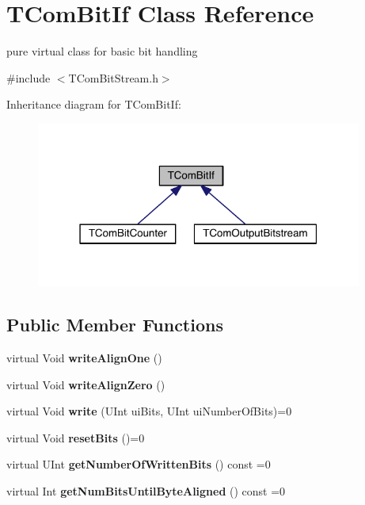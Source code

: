 \hypertarget{class_t_com_bit_if}{}\section{T\+Com\+Bit\+If Class Reference}
\label{class_t_com_bit_if}


pure virtual class for basic bit handling  




{\ttfamily \#include $<$T\+Com\+Bit\+Stream.\+h$>$}



Inheritance diagram for T\+Com\+Bit\+If\+:
\nopagebreak
\begin{figure}[H]
\begin{center}
\leavevmode
\includegraphics[width=304pt]{db/db8/class_t_com_bit_if__inherit__graph}
\end{center}
\end{figure}
\subsection*{Public Member Functions}
\begin{DoxyCompactItemize}
\item 
\mbox{\label{class_t_com_bit_if_a6108fee17446f2e83bc6075bc68acbe1}} 
virtual Void {\bfseries write\+Align\+One} ()
\item 
\mbox{\label{class_t_com_bit_if_accff98ede918d578b4d521e498b4a885}} 
virtual Void {\bfseries write\+Align\+Zero} ()
\item 
\mbox{\label{class_t_com_bit_if_a6046e15207509257bfc18788038f4a23}} 
virtual Void {\bfseries write} (U\+Int ui\+Bits, U\+Int ui\+Number\+Of\+Bits)=0
\item 
\mbox{\label{class_t_com_bit_if_a3a4899bb3adb46f34b3cb355de76dc1f}} 
virtual Void {\bfseries reset\+Bits} ()=0
\item 
\mbox{\label{class_t_com_bit_if_a9d4f21b59d67b6a579b0a075323ca35d}} 
virtual U\+Int {\bfseries get\+Number\+Of\+Written\+Bits} () const =0
\item 
\mbox{\label{class_t_com_bit_if_a89b5b6e8bcf7d418dda65249aa7cdad5}} 
virtual Int {\bfseries get\+Num\+Bits\+Until\+Byte\+Aligned} () const =0
\end{DoxyCompactItemize}


